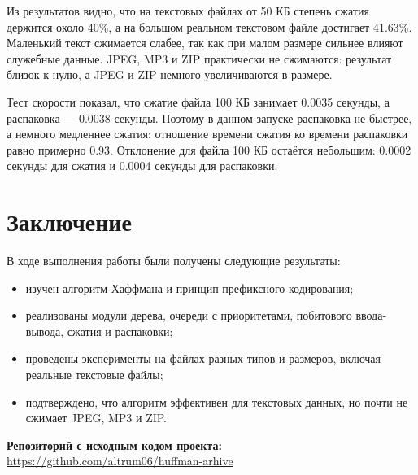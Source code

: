 \documentclass[14pt,a4paper]{extarticle}
\begin{document}
Из результатов видно, что на текстовых файлах от 50 КБ степень сжатия держится около 40\%, а на большом реальном текстовом файле достигает 41.63\%. Маленький текст сжимается слабее, так как при малом размере сильнее влияют служебные данные. JPEG, MP3 и ZIP практически не сжимаются: результат близок к нулю, а JPEG и ZIP немного увеличиваются в размере.

Тест скорости показал, что сжатие файла 100 КБ занимает 0.0035 секунды, а распаковка --- 0.0038 секунды. Поэтому в данном запуске распаковка не быстрее, а немного медленнее сжатия: отношение времени сжатия ко времени распаковки равно примерно 0.93. Отклонение для файла 100 КБ остаётся небольшим: 0.0002 секунды для сжатия и 0.0004 секунды для распаковки.

\section{Заключение}

В ходе выполнения работы были получены следующие результаты:

\begin{itemize}
    \item изучен алгоритм Хаффмана и принцип префиксного кодирования;
    \item реализованы модули дерева, очереди с приоритетами, побитового ввода-вывода, сжатия и распаковки;
    \item проведены эксперименты на файлах разных типов и размеров, включая реальные текстовые файлы;
    \item подтверждено, что алгоритм эффективен для текстовых данных, но почти не сжимает JPEG, MP3 и ZIP.
\end{itemize}

\noindent\textbf{Репозиторий с исходным кодом проекта:} \\
\href{https://github.com/altrum06/huffman-arhive}{https://github.com/altrum06/huffman-arhive}
\end{document}

